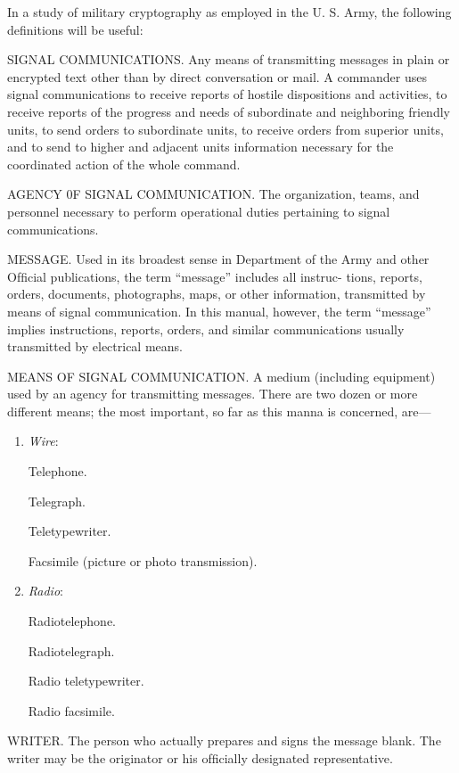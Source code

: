 In a study of military cryptography as employed in the U. S. Army,
the following deﬁnitions will be useful:

\mypara SIGNAL COMMUNICATIONS. Any means of transmitting messages
in plain or encrypted text other than by direct conversation or mail. A
commander uses signal communications to receive reports of hostile
dispositions and activities, to receive reports of the progress and needs
of subordinate and neighboring friendly units, to send orders to subordinate units, to receive orders from superior units, and to send to higher
and adjacent units information necessary for the coordinated action of
the whole command.

\mypara AGENCY 0F SIGNAL COMMUNICATION. The organization, teams, and
personnel necessary to perform operational duties pertaining to signal
communications.

\mypara MESSAGE. Used in its broadest sense in Department of the Army
and other Ofﬁcial publications, the term “message” includes all instruc-
tions, reports, orders, documents, photographs, maps, or other information, transmitted by means of signal communication. In this manual,
however, the term “message” implies instructions, reports, orders, and
similar communications usually transmitted by electrical means.

\mypara MEANS OF SIGNAL COMMUNICATION. A medium (including equipment) used by an agency for transmitting messages. There are two
dozen or more different means; the most important, so far as this manna
is concerned, are—

\begin{enumerate}
\item \textit{Wire}:

Telephone.

Telegraph.

Teletypewriter.

Facsimile (picture or photo transmission).

\item \textit{Radio}:

Radiotelephone.

Radiotelegraph.

Radio teletypewriter.

Radio facsimile.

\end{enumerate}

\mypara WRITER. The person who actually prepares and signs the message
blank. The writer may be the originator or his ofﬁcially designated
representative.

